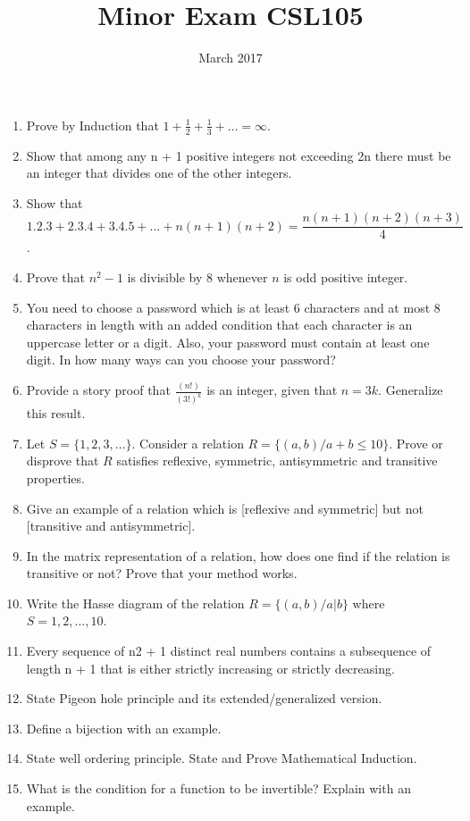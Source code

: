 \documentclass{article}
\title{Minor Exam CSL105}
\date{March 2017}
\begin{document}
\maketitle

\begin{enumerate}
    \item Prove by Induction that $1+\frac{1}{2}+\frac{1}{3}+\dots=\infty$. 
    \item Show that among any n + 1 positive integers not exceeding 2n there must be an integer that divides one of the other integers. 
    \item Show that $$1.2.3+2.3.4+3.4.5+\dots +n(n+1)(n+2)= \frac{n(n+1)(n+2)(n+3)}{4}$$. 
    \item Prove that $n^2-1$ is divisible by 8 whenever $n$ is odd positive integer. 
    \item You need to choose a password which is at least 6 characters and at most 8 characters in length with an added condition that each character is an uppercase letter or a digit. Also, your password must contain at least one digit. In how many ways can you choose your password? 
    \item Provide a story proof that $\frac{(n!)}{(3!)^k}$ is an integer, given that $n=3k$. Generalize this result. 
    \item Let $S=\{1,2,3,\dots\}$. Consider a relation $R=\{(a,b)/a+b\leq 10\}$. Prove or disprove that $R$ satisfies reflexive, symmetric, antisymmetric and transitive properties. 
    \item Give an example of a relation which is [reflexive and symmetric] but not [transitive and antisymmetric]. 
    \item In the matrix representation of a relation, how does one find if the relation is transitive or not? Prove that your method works. 
    \item Write the Hasse diagram of the relation $R=\{(a,b)/a|b\}$ where $S={1,2,\dots,10}$. 
    \item Every sequence of n2 + 1 distinct real numbers contains a subsequence of length n + 1 that is either strictly increasing or strictly decreasing. 
    \item State Pigeon hole principle and its extended/generalized version. 
    \item Define a bijection with an example. 
    \item State well ordering principle. State and Prove Mathematical Induction.
    \item What is the condition for a function to be invertible? Explain with an example. 

\end{enumerate}
\end{document}
